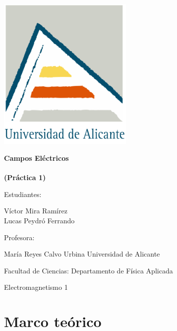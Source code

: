 \documentclass[11pt]{article}
\newcommand{\titulo}{Campos Eléctricos\\\ \\(Práctica 1)}
\newcommand{\nombreestudiante}{Víctor Mira Ramírez\\ Lucas Peydró Ferrando}
\newcommand{\nombredirector}{María Reyes Calvo Urbina}
\newcommand{\fecha}{\date{Junio 2023}}  %
\begin{document}
\begin{titlepage}
	\centering
	\includegraphics[width=65mm]{fotos/logoUA.png}\par
	\vspace{1cm}
	{\huge\bfseries \vspace{15mm} \titulo \par}
	\vfill
	{\large 
	\vfill
	Estudiantes:\par\vspace{2mm}
	\nombreestudiante\par
	\vfill
	Profesora:\par\vspace{2mm}
    \nombredirector
    \vfill
    Universidad de Alicante\par
    Facultad de Ciencias: Departamento de Física Aplicada\par
    Electromagnetismo 1\par
	\fecha\par}
\end{titlepage}

\pagebreak

\begin{abstract}\label{sec:abstract}
    \noindent El objetivo de esta práctica es el cálculo y representación visual de campos eléctricos debidos a distribuciones de cargas puntuales y distribuciones continuas. Para ello emplearemos dos métodos: mediante la superposición de los campos eléctricos debidos a cargas puntuales y mediante la resolución de forma numérica de la ecuación de Poisson.
\end{abstract}

\vspace{0.3cm}
\tableofcontents
\newpage
  
\section{Marco teórico}
\end{document}
